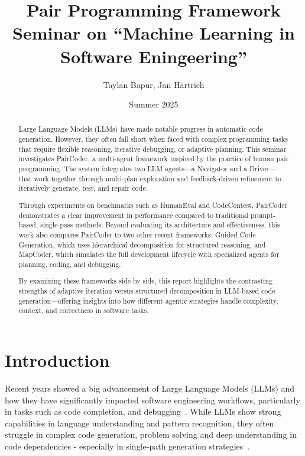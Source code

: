 \documentclass[11pt,a4paper]{article}
\title{Pair Programming  Framework \\[0.5em] \large{Seminar on ``Machine Learning in Software Eningeering'' \\[0.5em]} }
\author{Taylan Bapur, Jan Härtrich}
\date{Summer 2025}
\begin{document}
\maketitle

\begin{abstract}
Large Language Models (LLMs) have made notable progress in automatic code generation. However, they often fall short when faced with complex programming tasks that require flexible reasoning, iterative debugging, or adaptive planning. This seminar investigates PairCoder, a multi-agent framework inspired by the practice of human pair programming. The system integrates two LLM agents—a Navigator and a Driver—that work together through multi-plan exploration and feedback-driven refinement to iteratively generate, test, and repair code.

Through experiments on benchmarks such as HumanEval and CodeContest, PairCoder demonstrates a clear improvement in performance compared to traditional prompt-based, single-pass methods. Beyond evaluating its architecture and effectiveness, this work also compares PairCoder to two other recent frameworks: Guided Code Generation, which uses hierarchical decomposition for structured reasoning, and MapCoder, which simulates the full development lifecycle with specialized agents for planning, coding, and debugging.

By examining these frameworks side by side, this report highlights the contrasting strengths of adaptive iteration versus structured decomposition in LLM-based code generation—offering insights into how different agentic strategies handle complexity, context, and correctness in software tasks.


\end{abstract}

\newpage
\tableofcontents
\newpage

\section{Introduction}
Recent years showed a big advancement of Large Language Models (LLMs) and how they have significantly impacted software engineering workflows, particularly in tasks such as code completion, and debugging~\cite{zhang2024paircoder}. While LLMs show strong capabilities in language understanding and pattern recognition, they often struggle in complex code generation, problem solving and deep understanding in code dependencies - especially in single-path generation strategies~\cite{chen2024selfdebugging}.
\end{document}
